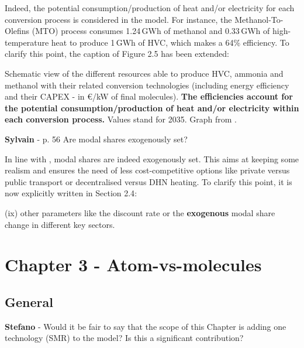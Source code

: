 \documentclass[12pt,a4paper]{article}
\begin{document}
\noindent Indeed, the potential consumption/production of heat and/or electricity for each conversion process is considered in the model. For instance, the Methanol-To-Olefins (MTO) process consumes 1.24\,GWh of methanol and 0.33\,GWh of high-temperature heat to produce 1\,GWh of HVC, which makes a 64\% efficiency. To clarify this point, {\color{blue}the caption of Figure 2.5} has been extended:

\begin{mdframed}[style=manuscript] %
Schematic view of the different resources able to produce HVC, ammonia and methanol with their related conversion technologies (including energy efficiency and their CAPEX - in €/kW of final molecules).  \textbf{The efficiencies account for the potential consumption/production of heat and/or electricity within each conversion process.} Values stand for 2035. Graph from \cite{rixhon2021comprehensive}.
\end{mdframed}

\begin{mdframed}[style=comment] %
{\color{purple} \textbf{Sylvain}} - p. 56 Are modal shares exogenously set?
\end{mdframed}

\noindent In line with \citet{limpens2019energyscope}, modal shares are indeed exogenously set. This aims at keeping some realism and ensures the need of less cost-competitive options like private versus public transport or decentralised versus DHN heating. To clarify this point, it is now explicitly written {\color{blue}in Section 2.4}:

\begin{mdframed}[style=manuscript] %
[...] (ix) other parameters like the discount rate or the \textbf{exogenous} modal share change in different key sectors.
\end{mdframed}

\section{Chapter 3 - Atom-vs-molecules}
\label{Chap_atom_vs_molecules}

\subsection{General}

\begin{mdframed}[style=comment] %
{\color{orange} \textbf{Stefano}} - Would it be fair to say that the scope of this Chapter is adding one technology (SMR) to the model? Is this a significant contribution?
\end{mdframed}
\end{document}
